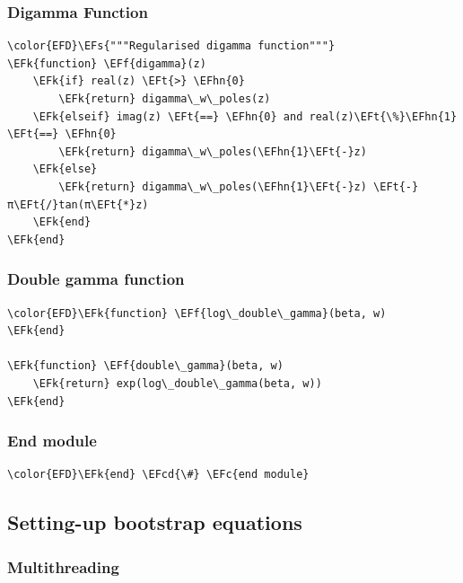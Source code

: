 \documentclass[a4paper]{article}
\numberwithin{equation}{section}
\newcommand{\EFc}[1]{\textcolor{EFc}{#1}} %
\newcommand{\EFcd}[1]{\textcolor{EFcd}{#1}} %
\newcommand{\EFs}[1]{\textcolor{EFs}{#1}} %
\newcommand{\EFk}[1]{\textcolor{EFk}{#1}} %
\newcommand{\EFf}[1]{\textcolor{EFf}{#1}} %
\newcommand{\EFt}[1]{\textcolor{EFt}{#1}} %
\newcommand{\EFhn}[1]{\textcolor{EFhn}{#1}} %
\begin{document}
\subsubsection*{Digamma Function}
\label{sec:orgf029d78}

\begin{Code}
\begin{Verbatim}
\color{EFD}\EFs{"""Regularised digamma function"""}
\EFk{function} \EFf{digamma}(z)
    \EFk{if} real(z) \EFt{>} \EFhn{0}
        \EFk{return} digamma\_w\_poles(z)
    \EFk{elseif} imag(z) \EFt{==} \EFhn{0} and real(z)\EFt{\%}\EFhn{1} \EFt{==} \EFhn{0}
        \EFk{return} digamma\_w\_poles(\EFhn{1}\EFt{-}z)
    \EFk{else}
        \EFk{return} digamma\_w\_poles(\EFhn{1}\EFt{-}z) \EFt{-} π\EFt{/}tan(π\EFt{*}z)
    \EFk{end}
\EFk{end}
\end{Verbatim}
\end{Code}
\subsubsection*{Double gamma function}
\label{sec:org38c4d7e}

\begin{Code}
\begin{Verbatim}
\color{EFD}\EFk{function} \EFf{log\_double\_gamma}(beta, w)
\EFk{end}

\EFk{function} \EFf{double\_gamma}(beta, w)
    \EFk{return} exp(log\_double\_gamma(beta, w))
\EFk{end}
\end{Verbatim}
\end{Code}
\subsubsection*{End module}
\label{sec:org8427fe7}

\begin{Code}
\begin{Verbatim}
\color{EFD}\EFk{end} \EFcd{\#} \EFc{end module}
\end{Verbatim}
\end{Code}
\subsection{Setting-up bootstrap equations}
\label{sec:org809478f}
\subsubsection*{Multithreading}
\label{sec:org4da2b4c}
\end{document}
